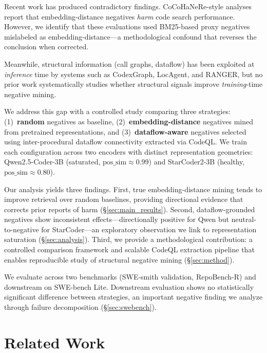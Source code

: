 \documentclass[11pt,a4paper]{article}
\begin{document}
Recent work has produced contradictory findings. CoCoHaNeRe-style analyses report that embedding-distance negatives \emph{harm} code search performance. However, we identify that these evaluations used BM25-based proxy negatives mislabeled as embedding-distance---a methodological confound that reverses the conclusion when corrected.

Meanwhile, structural information (call graphs, dataflow) has been exploited at \emph{inference} time by systems such as CodexGraph, LocAgent, and RANGER, but no prior work systematically studies whether structural signals improve \emph{training}-time negative mining.

We address this gap with a controlled study comparing three strategies: (1)~\textbf{random} negatives as baseline, (2)~\textbf{embedding-distance} negatives mined from pretrained representations, and (3)~\textbf{dataflow-aware} negatives selected using inter-procedural dataflow connectivity extracted via CodeQL. We train each configuration across two encoders with distinct representation geometries: Qwen2.5-Coder-3B (saturated, $\text{pos\_sim} \approx 0.99$) and StarCoder2-3B (healthy, $\text{pos\_sim} \approx 0.80$).

Our analysis yields three findings. First, true embedding-distance mining tends to improve retrieval over random baselines, providing directional evidence that corrects prior reports of harm (\S\ref{sec:main_results}). Second, dataflow-grounded negatives show inconsistent effects---directionally positive for Qwen but neutral-to-negative for StarCoder---an exploratory observation we link to representation saturation (\S\ref{sec:analysis}). Third, we provide a methodological contribution: a controlled comparison framework and scalable CodeQL extraction pipeline that enables reproducible study of structural negative mining (\S\ref{sec:method}).

We evaluate across two benchmarks (SWE-smith validation, RepoBench-R) and downstream on SWE-bench Lite. Downstream evaluation shows no statistically significant difference between strategies, an important negative finding we analyze through failure decomposition (\S\ref{sec:swebench}).

\section{Related Work}
\label{sec:related}
\end{document}
